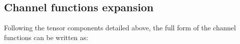\documentclass[10pt]{article}
\begin{document}


\subsection{Channel functions expansion\label{sec:channel-funs-full}}

Following the tensor components detailed above, the full form of the channel functions can be written as:






\end{document}
